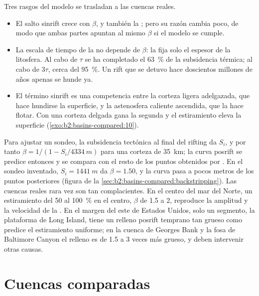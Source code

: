 Tres rasgos del modelo se trasladan a las cuencas reales.
\begin{itemize}
  \item El salto sinrift crece con $\beta$, y también la ; pero su
        razón cambia poco, de modo que ambas partes apuntan al mismo $\beta$ si el modelo se cumple.
  \item La escala de tiempo de la  no depende de $\beta$: la fija solo el
        espesor de la litosfera. Al cabo de $\tau$ se ha completado el \qty{63}{\percent} de la subsidencia
        térmica; al cabo de $3\tau$, cerca del \qty{95}{\percent}. Un rift que se detuvo hace doscientos
        millones de años apenas se hunde ya.
  \item El término sinrift es una competencia entre la corteza ligera adelgazada, que hace hundirse
        la superficie, y la astenosfera caliente ascendida, que la hace flotar. Con una corteza delgada gana
        la segunda y el estiramiento eleva la superficie (\cref{exo:b2:basins-compared:10}).
\end{itemize}

Para ajustar un sondeo, la subsidencia tectónica al final del rifting da $S_i$, y por tanto
$\beta = 1/(1 - S_i/\qty{4334}{m})$ para una corteza de \qty{35}{km}; la curva posrift se predice entonces
y se compara con el resto de los puntos obtenidos por . En el sondeo inventado, $S_i = \qty{1441}{m}$
da $\beta = 1.50$, y la curva pasa a pocos metros de los puntos posteriores (figura de la
\cref{sec:b2:basins-compared:backstripping}). Las cuencas reales rara vez son tan complacientes. En el
centro del mar del Norte, un estiramiento del 50 al \qty{100}{\percent} en el centro, $\beta$ de 1.5 a 2,
reproduce la amplitud y la velocidad de la . En el margen del este de
Estados Unidos, solo un segmento, la plataforma de Long Island, tiene un relleno posrift temprano tan grueso
como predice el estiramiento uniforme; en la cuenca de Georges Bank y la fosa de Baltimore Canyon el
relleno es de 1.5 a 3 veces más grueso, y deben intervenir otras causas.

\section{Cuencas comparadas}\label{sec:b2:basins-compared:compared}

